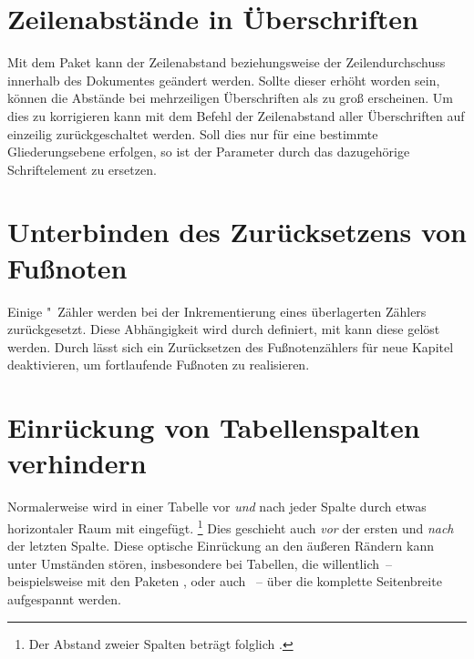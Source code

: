 \section{%
  Zeilenabstände in Überschriften%
  \label{sec:tips:headings}%
}

Mit dem Paket  kann der Zeilenabstand beziehungsweise der 
Zeilendurchschuss innerhalb des Dokumentes geändert werden. Sollte dieser 
erhöht worden sein, können die Abstände bei mehrzeiligen Überschriften als zu 
groß erscheinen. Um dies zu korrigieren kann mit dem Befehl 
der Zeilenabstand aller Überschriften auf einzeilig zurückgeschaltet werden. 
Soll dies nur für eine bestimmte Gliederungsebene erfolgen, so ist der 
Parameter  durch das dazugehörige Schriftelement zu 
ersetzen.



\section{%
  Unterbinden des Zurücksetzens von Fußnoten%
  \label{sec:tips:counter}%
}

Einige "~Zähler werden bei der Inkrementierung eines 
überlagerten Zählers zurückgesetzt. Diese Abhängigkeit wird durch 
 definiert, mit  kann diese gelöst 
werden. Durch  lässt 
sich ein Zurücksetzen des Fußnotenzählers für neue Kapitel deaktivieren, um 
fortlaufende Fußnoten zu realisieren.



\section{%
  Einrückung von Tabellenspalten verhindern%
  \label{sec:tips:table}%
}

Normalerweise wird in einer Tabelle vor \emph{und} nach jeder Spalte durch 
 etwas horizontaler Raum mit  
eingefügt.%
\footnote{%
  Der Abstand zweier Spalten beträgt folglich .%
}
Dies geschieht auch \emph{vor} der ersten und \emph{nach} der letzten Spalte. 
Diese optische Einrückung an den äußeren Rändern kann unter Umständen stören, 
insbesondere bei Tabellen, die willentlich~-- beispielsweise mit den Paketen 
,  oder auch ~-- über die 
komplette Seitenbreite aufgespannt werden.

